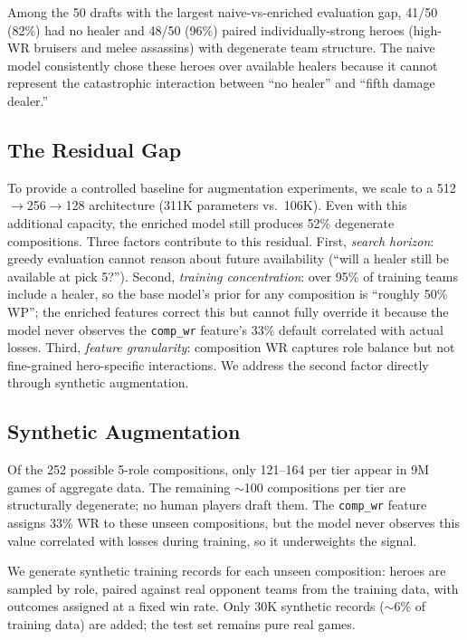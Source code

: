 \documentclass[conference]{IEEEtran}
\begin{document}
Among the 50 drafts with the largest naive-vs-enriched evaluation gap, 41/50 (82\%) had no healer and 48/50 (96\%) paired individually-strong heroes (high-WR bruisers and melee assassins) with degenerate team structure. The naive model consistently chose these heroes over available healers because it cannot represent the catastrophic interaction between ``no healer'' and ``fifth damage dealer.''

\subsection{The Residual Gap}

To provide a controlled baseline for augmentation experiments, we scale to a 512$\to$256$\to$128 architecture (311K parameters vs.\ 106K). Even with this additional capacity, the enriched model still produces 52\% degenerate compositions. Three factors contribute to this residual. First, \textit{search horizon}: greedy evaluation cannot reason about future availability (``will a healer still be available at pick 5?''). Second, \textit{training concentration}: over 95\% of training teams include a healer, so the base model's prior for any composition is ``roughly 50\% WP''; the enriched features correct this but cannot fully override it because the model never observes the \texttt{comp\_wr} feature's 33\% default correlated with actual losses. Third, \textit{feature granularity}: composition WR captures role balance but not fine-grained hero-specific interactions. We address the second factor directly through synthetic augmentation.

\subsection{Synthetic Augmentation}

Of the 252 possible 5-role compositions, only 121--164 per tier appear in 9M games of aggregate data. The remaining $\sim$100 compositions per tier are structurally degenerate; no human players draft them. The \texttt{comp\_wr} feature assigns 33\% WR to these unseen compositions, but the model never observes this value correlated with losses during training, so it underweights the signal.

We generate synthetic training records for each unseen composition: heroes are sampled by role, paired against real opponent teams from the training data, with outcomes assigned at a fixed win rate. Only 30K synthetic records ($\sim$6\% of training data) are added; the test set remains pure real games.
\end{document}
